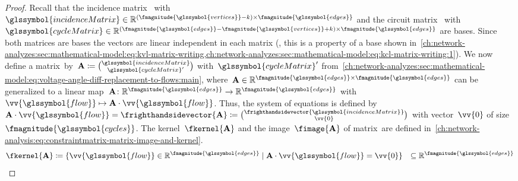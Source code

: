\begin{proof}
%
Recall that the incidence matrix~ with~$
    \glssymbol{incidenceMatrix} 
    \in
    \reals^{
    (\fmagnitude{\glssymbol{vertices}} 
    - k)
    \times
    \fmagnitude{\glssymbol{edges}}}
$ and the circuit matrix~ with~$
    \glssymbol{cycleMatrix}
    \in
    \reals^{
    ( \fmagnitude{\glssymbol{edges}} 
    - \fmagnitude{\glssymbol{vertices}} 
    + k)
    \times
    \fmagnitude{\glssymbol{edges}}}
$ are bases. Since both matrices are bases the vectors are linear independent
in each matrix (\ie, this is a property of a base shown
in~\cref{ch:network-analyzes:sec:mathematical-model:eq:kvl-matrix-writing,ch:network-analyzes:sec:mathematical-model:eq:kcl-matrix-writing:1}).
% 
We now define a matrix~\constraintmatrix by~$
    \constraintmatrix 
    \coloneqq
    \binom{
        \glssymbol{incidenceMatrix}
    }{
        \glssymbol{cycleMatrix}'
    }
$ with~$\glssymbol{cycleMatrix}'$ from~\cref{ch:network-analyzes:sec:mathematical-model:eq:voltage-angle-diff-replacement-to-flows:main},
where~$
    \constraintmatrix
    \in
    \reals^{\fmagnitude{\glssymbol{edges}}\times\fmagnitude{\glssymbol{edges}}}
$ can be generalized to a linear map~$
    \constraintmatrix
    \colon
    \reals^{ \fmagnitude{ \glssymbol{edges} } }%
    \to
    \reals^{ \fmagnitude{ \glssymbol{edges} } }%
$ with~$
    \vv{ \glssymbol{flow} }%
    \mapsto%
    \constraintmatrix%
    \cdot%
    \vv{\glssymbol{flow}}%
$. Thus, the system of equations is defined by~$
    \constraintmatrix
    \cdot
    \vv{\glssymbol{flow}} 
    = 
    \frighthandsidevector{\constraintmatrix} 
    \coloneqq 
    \binom{
        \frighthandsidevector{\glssymbol{incidenceMatrix}}
    }{
        \vv{0}
    }
$ with vector~$\vv{0}$ of size~$
% 
\fmagnitude{\glssymbol{cycles}}
% 
$.
% 
The kernel~$\fkernel{\constraintmatrix}$ and the
image~$\fimage{\constraintmatrix}$ of matrix~\constraintmatrix are defined
in~\cref{ch:network-analysis:eq:constraintmatrix-matrix-image-and-kernel}.
%
\begin{subequations}
% 
\begin{align}
    \fkernel{\constraintmatrix}
    &
    \coloneqq 
    \{
        \vv{\glssymbol{flow}}
        \in
        \reals^{\fmagnitude{\glssymbol{edges}}}
        \mid 
        \constraintmatrix
        \cdot
        \vv{\glssymbol{flow}} 
        = 
        \vv{0}
    \} 
    &
    \subseteq
    \reals^{\fmagnitude{\glssymbol{edges}}}

\end{align}
\end{subequations}
\end{proof}
